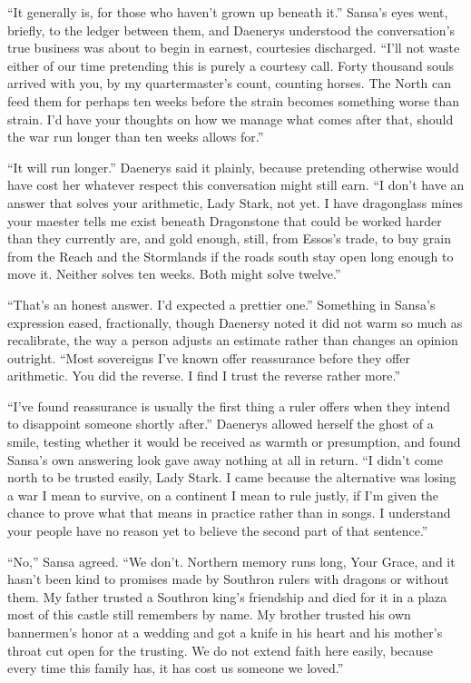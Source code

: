 “It generally is, for those who haven’t grown up beneath it.” Sansa’s eyes went, briefly, to the ledger between them, and Daenerys understood the conversation’s true business was about to begin in earnest, courtesies discharged. “I’ll not waste either of our time pretending this is purely a courtesy call. Forty thousand souls arrived with you, by my quartermaster’s count, counting horses. The North can feed them for perhaps ten weeks before the strain becomes something worse than strain. I’d have your thoughts on how we manage what comes after that, should the war run longer than ten weeks allows for.”

“It will run longer.” Daenerys said it plainly, because pretending otherwise would have cost her whatever respect this conversation might still earn. “I don’t have an answer that solves your arithmetic, Lady Stark, not yet. I have dragonglass mines your maester tells me exist beneath Dragonstone that could be worked harder than they currently are, and gold enough, still, from Essos’s trade, to buy grain from the Reach and the Stormlands if the roads south stay open long enough to move it. Neither solves ten weeks. Both might solve twelve.”

“That’s an honest answer. I’d expected a prettier one.” Something in Sansa’s expression eased, fractionally, though Daenersy noted it did not warm so much as recalibrate, the way a person adjusts an estimate rather than changes an opinion outright. “Most sovereigns I’ve known offer reassurance before they offer arithmetic. You did the reverse. I find I trust the reverse rather more.”

“I’ve found reassurance is usually the first thing a ruler offers when they intend to disappoint someone shortly after.” Daenerys allowed herself the ghost of a smile, testing whether it would be received as warmth or presumption, and found Sansa’s own answering look gave away nothing at all in return. “I didn’t come north to be trusted easily, Lady Stark. I came because the alternative was losing a war I mean to survive, on a continent I mean to rule justly, if I’m given the chance to prove what that means in practice rather than in songs. I understand your people have no reason yet to believe the second part of that sentence.”

“No,” Sansa agreed. “We don’t. Northern memory runs long, Your Grace, and it hasn’t been kind to promises made by Southron rulers with dragons or without them. My father trusted a Southron king’s friendship and died for it in a plaza most of this castle still remembers by name. My brother trusted his own bannermen’s honor at a wedding and got a knife in his heart and his mother’s throat cut open for the trusting. We do not extend faith here easily, because every time this family has, it has cost us someone we loved.”

